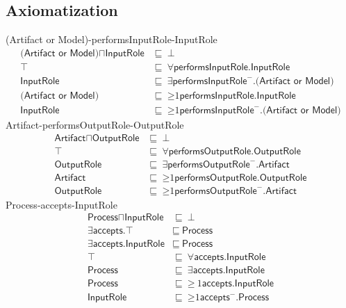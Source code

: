 \subsection{Axiomatization}
\label{axs:2a}
\textsf{(Artifact or Model)}-\textsf{performsInputRole}-\textsf{InputRole}
\begin{align}
\textsf{(Artifact or Model)} \sqcap \textsf{InputRole} &\sqsubseteq~\bot \\ %
\textsf{$\top$} &\sqsubseteq~\forall\textsf{performsInputRole.InputRole} \\ %
\textsf{InputRole} &\sqsubseteq~\exists\textsf{performsInputRole}^-\textsf{.(Artifact or Model)} \\ %
\textsf{(Artifact or Model)} &\sqsubseteq~\mathord{\geq}1\textsf{performsInputRole.InputRole} \\ %
\textsf{InputRole} &\sqsubseteq~\mathord{\geq}1\textsf{performsInputRole}^-\textsf{.(Artifact or Model)} %
\end{align}
\textsf{Artifact}-\textsf{performsOutputRole}-\textsf{OutputRole}
\begin{align}
    \textsf{Artifact} \sqcap \textsf{OutputRole} &\sqsubseteq~\bot \\ %
    \textsf{$\top$} &\sqsubseteq~\forall\textsf{performsOutputRole.OutputRole} \\ %
    \textsf{OutputRole} &\sqsubseteq~\exists\textsf{performsOutputRole}^-\textsf{.Artifact} \\ %
    \textsf{Artifact} &\sqsubseteq~\mathord{\geq}1\textsf{performsOutputRole.OutputRole} \\ %
    \textsf{OutputRole} &\sqsubseteq~\mathord{\geq}1\textsf{performsOutputRole}^-\textsf{.Artifact} %
\end{align}
\textsf{Process}-\textsf{accepts}-\textsf{InputRole}
\begin{align}
    \textsf{Process} \sqcap \textsf{InputRole} &\sqsubseteq~\bot \\ %
    \exists\textsf{accepts.$\top$} &\sqsubseteq~\textsf{Process} \\ %
    \exists\textsf{accepts.InputRole} &\sqsubseteq~\textsf{Process} \\ %
    \textsf{$\top$} &\sqsubseteq~\forall\textsf{accepts.InputRole} \\ %
    \textsf{Process} &\sqsubseteq~\exists\textsf{accepts.InputRole} \\ %
    \textsf{Process} &\sqsubseteq~\mathord{\geq}~1\textsf{accepts.InputRole} \\ %
    \textsf{InputRole} &\sqsubseteq~\mathord{\geq}1 \textsf{accepts}^-\textsf{.Process} %
\end{align}
